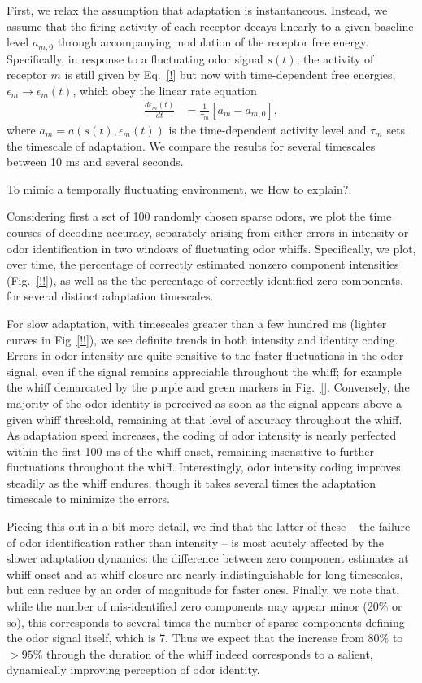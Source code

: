First, we relax the assumption that adaptation is instantaneous. Instead, we assume that the firing activity of each receptor decays linearly to a given baseline level $a_{m, 0}$ through accompanying modulation of the receptor free energy. Specifically, in response to a fluctuating odor signal $s(t)$, the activity of receptor $m$ is still given by Eq.~\ref{!} but now with time-dependent free energies, $\epsilon_m \rightarrow \epsilon_m(t)$, which obey the linear rate equation
\begin{align}
\frac{d\epsilon_m(t)}{dt} &= \frac{1}{\tau_m}\left[a_m - a_{m,0}\right],
\end{align}
where $a_m = a(s(t), \epsilon_m(t))$ is the time-dependent activity level and $\tau_m$ sets the timescale of adaptation. We compare the results for several timescales between 10 ms and several seconds.

To mimic a temporally fluctuating environment, we {\color{blue} How to explain?}. 


Considering first a set of 100 randomly chosen sparse odors, we plot the time courses of decoding accuracy, separately arising from either errors in intensity or odor identification in two windows of fluctuating odor whiffs. Specifically, we plot, over time, the percentage of correctly estimated nonzero component intensities (Fig.~\ref{!!}), as well as the the percentage of correctly identified zero components, for several distinct adaptation timescales. 

For slow adaptation, with timescales greater than a few hundred ms (lighter curves in Fig~\ref{!!}), we see definite trends in both intensity and identity coding. Errors in odor intensity are quite sensitive to the faster fluctuations in the odor signal, even if the signal remains appreciable throughout the whiff; for example the whiff demarcated by the purple and green markers in Fig.~\ref{}. Conversely, the majority of the odor identity is perceived as soon as the signal appears above a given whiff threshold, remaining at that level of accuracy throughout the whiff. As adaptation speed increases, the coding of odor intensity is nearly perfected within the first 100 ms of the whiff onset, remaining insensitive to further fluctuations throughout the whiff. Interestingly, odor intensity coding improves steadily as the whiff endures, though it takes several times the adaptation timescale to minimize the errors. 

Piecing this out in a bit more detail, we find that the latter of these -- the failure of odor identification rather than intensity -- is most acutely affected by the slower adaptation dynamics: the difference between zero component estimates at whiff onset and at whiff closure are nearly indistinguishable for long timescales, but can reduce by an order of magnitude for faster ones. Finally, we note that, while the number of mis-identified zero components may appear minor (20\% or so), this corresponds to several times the number of sparse components defining the odor signal itself, which is 7. Thus we expect that the increase from 80\% to $> 95$\% through the duration of the whiff indeed corresponds to a salient, dynamically improving perception of odor identity. 

